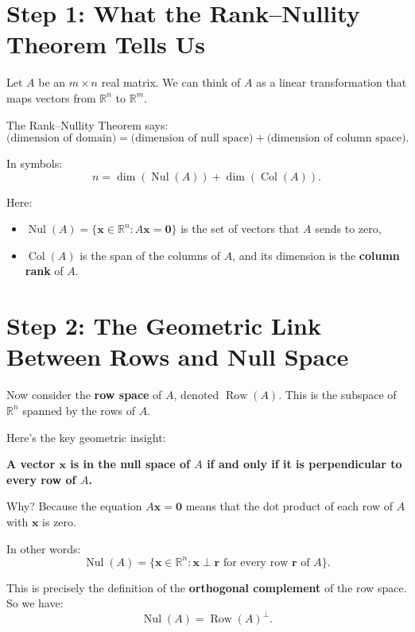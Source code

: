 \documentclass[11pt]{article}
\begin{document}
\section*{Step 1: What the Rank--Nullity Theorem Tells Us}

Let $ A $ be an $ m \times n $ real matrix.  
We can think of $ A $ as a linear transformation that maps vectors from $ \mathbb{R}^n $ to $ \mathbb{R}^m $.

The Rank--Nullity Theorem says:
\[
\text{(dimension of domain)} = \text{(dimension of null space)} + \text{(dimension of column space)}.
\]

In symbols:
\[
n = \dim(\operatorname{Nul}(A)) + \dim(\operatorname{Col}(A)).
\tag{1}
\]

Here:
\begin{itemize}
\item $ \operatorname{Nul}(A) = \{ \mathbf{x} \in \mathbb{R}^n : A\mathbf{x} = \mathbf{0} \} $ is the set of vectors that $ A $ sends to zero,
    \item $ \operatorname{Col}(A) $ is the span of the columns of $ A $, and its dimension is the \textbf{column rank} of $ A $.
\end{itemize}

\section*{Step 2: The Geometric Link Between Rows and Null Space}

Now consider the \textbf{row space} of $ A $, denoted $ \operatorname{Row}(A) $.  
This is the subspace of $ \mathbb{R}^n $ spanned by the rows of $ A $.

Here’s the key geometric insight:

\begin{center}
\textbf{A vector $ \mathbf{x} $ is in the null space of $ A $ if and only if it is perpendicular to every row of $ A $.}
\end{center}

Why? Because the equation $ A\mathbf{x} = \mathbf{0} $ means that the dot product of each row of $ A $ with $ \mathbf{x} $ is zero.

In other words:
\[
\operatorname{Nul}(A) = \{ \mathbf{x} \in \mathbb{R}^n : \mathbf{x} \perp \mathbf{r} \text{ for every row } \mathbf{r} \text{ of } A \}.
\]

This is precisely the definition of the \textbf{orthogonal complement} of the row space. So we have:
\[
\operatorname{Nul}(A) = \operatorname{Row}(A)^\perp.
\tag{2}
\]
\end{document}

